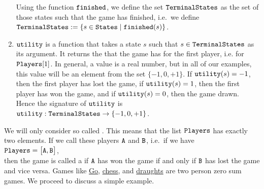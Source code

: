\begin{enumerate}
      Using the function $\texttt{finished}$, we define the set $\texttt{TerminalStates}$ as the set of those
      states such that the game has finished,  i.e.~we define 
      \\[0.2cm]
      \hspace*{1.3cm}
      $\texttt{TerminalStates} := \{ s \in \texttt{States} \mid \texttt{finished}(s) \}$.
\item $\texttt{utility}$ is a function that takes a state $s$ such that $s \in \texttt{TerminalStates}$ as its argument.  It returns 
      the  that the game has for the first player, i.e. for $\texttt{Players}[1]$.  In general, a
      value is a real number,  but in all of our examples, this value will be an element from the set
      $\{-1, 0, +1\}$.  If $\texttt{utility}(s) = -1$,  
      then the first player has lost the game, if $\texttt{utility}(s) = 1$, then the first player has won the
      game, and if $\texttt{utility}(s) = 0$, then the game drawn.  Hence the signature of $\texttt{utility}$ is
      \\[0.2cm]
      \hspace*{1.3cm}
      $\texttt{utility}: \texttt{TerminalStates} \rightarrow \{ -1, 0, +1\}$.
\end{enumerate}
We will only consider so called .  
This means that the list $\texttt{Players}$ has exactly two elements.  If we call these players $\texttt{A}$ and $\texttt{B}$, i.e.~if we have
\\[0.2cm]
\hspace*{1.3cm}
$\texttt{Players} = \bigl[ \texttt{A}, \texttt{B} \bigr]$,
\\[0.2cm]
then the game is called a   if $\texttt{A}$ has won the game if
and only if $\texttt{B}$ has lost the game and vice versa.
Games like \href{https://en.wikipedia.org/wiki/Go_(game)}{Go}, 
\href{https://en.wikipedia.org/wiki/Chess}{chess}, and
\href{https://en.wikipedia.org/wiki/Draughts}{draughts} are two person zero sum games.
We proceed to discuss a simple example.

